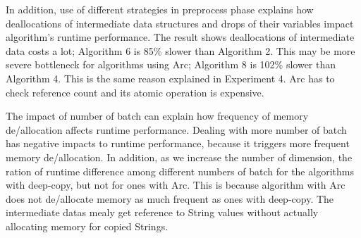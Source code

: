 In addition, use of different strategies in preprocess phase explains how deallocations of intermediate data structures and drops of their variables impact algorithm's runtime performance.
The result shows deallocations of intermediate data costs a lot; Algorithm 6 is 85\% slower than Algorithm 2.
This may be more severe bottleneck for algorithms using Arc; Algorithm 8 is 102\% slower than Algorithm 4.
This is the same reason explained in Experiment 4. 
Arc has to check reference count and its atomic operation is expensive. 

The impact of number of batch can explain how frequency of memory de/allocation affects runtime performance. 
Dealing with more number of batch has negative impacts to runtime performance, because it triggers more frequent memory de/allocation.
In addition, as we increase the number of dimension, the ration of runtime difference among different numbers of batch for the algorithms with deep-copy, but not for ones with Arc.
This is because algorithm with Arc does not de/allocate memory as much frequent as ones with deep-copy.
The intermediate datas mealy get reference to String values without actually allocating memory for copied Strings.




